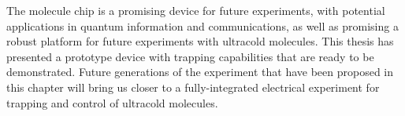 The molecule chip is a promising device for future experiments, with potential
applications in quantum information and communications, as well as promising a
robust platform for future experiments with ultracold molecules. This thesis
has presented a prototype device with trapping capabilities that are ready to
be demonstrated. Future generations of the experiment that have been proposed
in this chapter will bring us closer to a fully-integrated electrical
experiment for trapping and control of ultracold molecules.

